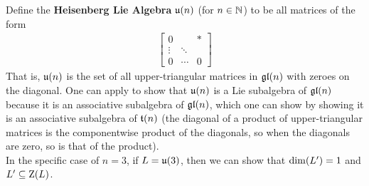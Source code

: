 \begin{boxexample}\label{Ch1:Eg:Heisenberg_Lie_Algebra}
    Define the \textbf{Heisenberg Lie Algebra} $\mathfrak{u}\!\left( n \right)$ (for $n \in \mathbb{N}$) to be all matrices of the form
    \begin{align*}
        \begin{bmatrix}
            0 & & * \\
            \vdots & \ddots & \\
            0 & \cdots & 0
        \end{bmatrix}
    \end{align*}
    That is, $\mathfrak{u}\!\left( n \right)$ is the set of all upper-triangular matrices in $\mathfrak{gl}\!\left( n \right)$ with zeroes on the diagonal. One can apply  to show that $\mathfrak{u}\!\left( n \right)$ is a Lie subalgebra of $\mathfrak{gl}\!\left( n \right)$ because it is an associative subalgebra of $\mathfrak{gl}\!\left( n \right)$, which one can show by showing it is an associative subalgebra of $\mathfrak{t}\!\left( n \right)$ (the diagonal of a product of upper-triangular matrices is the componentwise product of the diagonals, so when the diagonals are zero, so is that of the product). \\

    In the specific case of $n = 3$, if $L = \mathfrak{u}\!\left( 3 \right)$, then we can show that $\dim\!\left( L' \right) = 1$ and $L' \subseteq \operatorname{Z}\!\left( L \right)$. \\
    

\end{boxexample}
